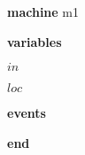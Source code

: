 \begin{block}
  \item   \textbf{machine} m1
  \item   \textbf{variables}
  \begin{block}
    \item   $in$
    \item   $loc$
  \end{block}
  \item   
  \item   
  \item   
  \item   
  \item   \textbf{events}
  \begin{block}
    \item   
    \item   
    \item   
    \item   
  \end{block}
  \item   \textbf{end} \\
\end{block}
